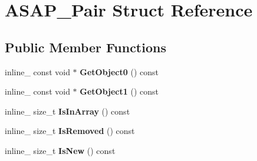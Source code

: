 \hypertarget{struct_a_s_a_p___pair}{\section{A\+S\+A\+P\+\_\+\+Pair Struct Reference}
\label{struct_a_s_a_p___pair}
}
\subsection*{Public Member Functions}
\begin{DoxyCompactItemize}
\item 
\hypertarget{struct_a_s_a_p___pair_aaecd504d36fdb867951ff268cec96b42}{inline\+\_\+ const void $\ast$ {\bfseries Get\+Object0} () const }\label{struct_a_s_a_p___pair_aaecd504d36fdb867951ff268cec96b42}

\item 
\hypertarget{struct_a_s_a_p___pair_ac832f266df04e3b013f05120f553f012}{inline\+\_\+ const void $\ast$ {\bfseries Get\+Object1} () const }\label{struct_a_s_a_p___pair_ac832f266df04e3b013f05120f553f012}

\item 
\hypertarget{struct_a_s_a_p___pair_a692a4da65db2f8ae55b67ed9402ef9df}{inline\+\_\+ size\+\_\+t {\bfseries Is\+In\+Array} () const }\label{struct_a_s_a_p___pair_a692a4da65db2f8ae55b67ed9402ef9df}

\item 
\hypertarget{struct_a_s_a_p___pair_a1925eef6d8d041aca3f653031a3eeb3f}{inline\+\_\+ size\+\_\+t {\bfseries Is\+Removed} () const }\label{struct_a_s_a_p___pair_a1925eef6d8d041aca3f653031a3eeb3f}

\item 
\hypertarget{struct_a_s_a_p___pair_a3798a2a198fd311dd2c8cb80c2258430}{inline\+\_\+ size\+\_\+t {\bfseries Is\+New} () const }\label{struct_a_s_a_p___pair_a3798a2a198fd311dd2c8cb80c2258430}

\end{DoxyCompactItemize}
